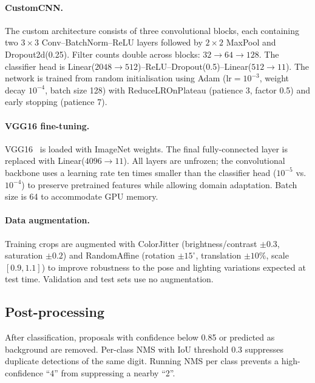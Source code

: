 \documentclass[10pt,twocolumn]{article}
\begin{document}
\paragraph{CustomCNN.}
The custom architecture consists of three convolutional blocks, each
containing two $3\times3$ Conv--BatchNorm--ReLU layers followed by
$2\times2$ MaxPool and Dropout2d(0.25).
Filter counts double across blocks: $32\to64\to128$.
The classifier head is Linear($2048\to512$)--ReLU--Dropout(0.5)--Linear($512\to11$).
The network is trained from random initialisation using Adam
($\text{lr}=10^{-3}$, weight decay $10^{-4}$, batch size 128) with
ReduceLROnPlateau (patience 3, factor 0.5) and early stopping (patience 7).

\paragraph{VGG16 fine-tuning.}
VGG16~\cite{simonyan2015vgg} is loaded with ImageNet weights.
The final fully-connected layer is replaced with Linear($4096\to11$).
All layers are unfrozen; the convolutional backbone uses a learning rate
ten times smaller than the classifier head ($10^{-5}$ vs.\ $10^{-4}$) to
preserve pretrained features while allowing domain adaptation.
Batch size is 64 to accommodate GPU memory.

\paragraph{Data augmentation.}
Training crops are augmented with ColorJitter (brightness/contrast $\pm0.3$,
saturation $\pm0.2$) and RandomAffine (rotation $\pm15^\circ$, translation
$\pm10\%$, scale $[0.9, 1.1]$) to improve robustness to the pose and
lighting variations expected at test time.
Validation and test sets use no augmentation.

\subsection{Post-processing}

After classification, proposals with confidence below 0.85 or predicted as
background are removed.
Per-class NMS with IoU threshold 0.3 suppresses duplicate detections of the
same digit.
Running NMS per class prevents a high-confidence ``4'' from suppressing a
nearby ``2''.
\end{document}
